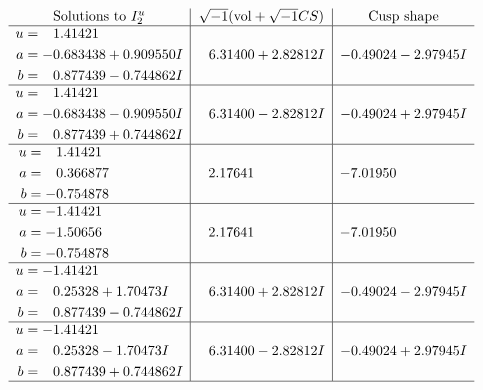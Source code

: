 \documentclass[1p]{elsarticle_modified}
\theoremstyle{definition}
\newcommand{\I}{\sqrt{-1}}
\begin{document}
$$\begin{array}{c|c|c}  
\text{Solutions to }I^u_{2}& \I (\text{vol} + \sqrt{-1}CS) & \text{Cusp shape}\\
 \hline 
\begin{aligned}
u &= \phantom{-}1.41421\phantom{ +0.000000I} \\
a &= -0.683438 + 0.909550 I \\
b &= \phantom{-}0.877439 - 0.744862 I\end{aligned}
 & \phantom{-}6.31400 + 2.82812 I & -0.49024 - 2.97945 I \\ \hline\begin{aligned}
u &= \phantom{-}1.41421\phantom{ +0.000000I} \\
a &= -0.683438 - 0.909550 I \\
b &= \phantom{-}0.877439 + 0.744862 I\end{aligned}
 & \phantom{-}6.31400 - 2.82812 I & -0.49024 + 2.97945 I \\ \hline\begin{aligned}
u &= \phantom{-}1.41421\phantom{ +0.000000I} \\
a &= \phantom{-}0.366877\phantom{ +0.000000I} \\
b &= -0.754878\phantom{ +0.000000I}\end{aligned}
 & \phantom{-}2.17641\phantom{ +0.000000I} & -7.01950\phantom{ +0.000000I} \\ \hline\begin{aligned}
u &= -1.41421\phantom{ +0.000000I} \\
a &= -1.50656\phantom{ +0.000000I} \\
b &= -0.754878\phantom{ +0.000000I}\end{aligned}
 & \phantom{-}2.17641\phantom{ +0.000000I} & -7.01950\phantom{ +0.000000I} \\ \hline\begin{aligned}
u &= -1.41421\phantom{ +0.000000I} \\
a &= \phantom{-}0.25328 + 1.70473 I \\
b &= \phantom{-}0.877439 - 0.744862 I\end{aligned}
 & \phantom{-}6.31400 + 2.82812 I & -0.49024 - 2.97945 I \\ \hline\begin{aligned}
u &= -1.41421\phantom{ +0.000000I} \\
a &= \phantom{-}0.25328 - 1.70473 I \\
b &= \phantom{-}0.877439 + 0.744862 I\end{aligned}
 & \phantom{-}6.31400 - 2.82812 I & -0.49024 + 2.97945 I\\
 \hline 
 \end{array}$$\newpage\newpage\renewcommand{\arraystretch}{1}
\end{document}
